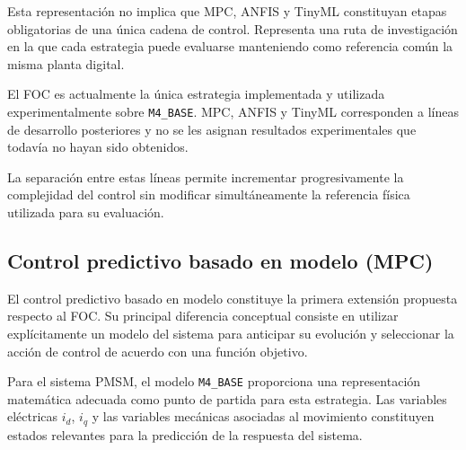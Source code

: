 \begin{center}
\end{center}

Esta representación no implica que MPC, ANFIS y TinyML constituyan etapas obligatorias de una única cadena de control. Representa una ruta de investigación en la que cada estrategia puede evaluarse manteniendo como referencia común la misma planta digital.

El FOC es actualmente la única estrategia implementada y utilizada experimentalmente sobre \texttt{M4\_BASE}. MPC, ANFIS y TinyML corresponden a líneas de desarrollo posteriores y no se les asignan resultados experimentales que todavía no hayan sido obtenidos.

La separación entre estas líneas permite incrementar progresivamente la complejidad del control sin modificar simultáneamente la referencia física utilizada para su evaluación.

\subsection{Control predictivo basado en modelo (MPC)}

El control predictivo basado en modelo constituye la primera extensión propuesta respecto al FOC. Su principal diferencia conceptual consiste en utilizar explícitamente un modelo del sistema para anticipar su evolución y seleccionar la acción de control de acuerdo con una función objetivo.

Para el sistema PMSM, el modelo \texttt{M4\_BASE} proporciona una representación matemática adecuada como punto de partida para esta estrategia. Las variables eléctricas $i_d$, $i_q$ y las variables mecánicas asociadas al movimiento constituyen estados relevantes para la predicción de la respuesta del sistema.

